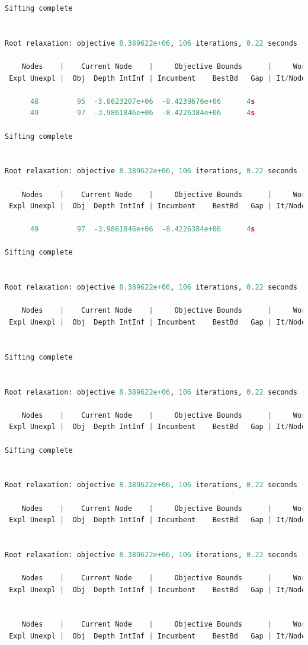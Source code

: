 \documentclass{write_paper}
\begin{document}
\begin{lstlisting}[language=python]
Sifting complete


Root relaxation: objective 8.389622e+06, 106 iterations, 0.22 seconds (0.14 work units)

    Nodes    |    Current Node    |     Objective Bounds      |     Work
 Expl Unexpl |  Obj  Depth IntInf | Incumbent    BestBd   Gap | It/Node Time

      48         95  -3.8623207e+06  -8.4239676e+06      4s
      49         97  -3.9861846e+06  -8.4226384e+06      4s

Sifting complete


Root relaxation: objective 8.389622e+06, 106 iterations, 0.22 seconds (0.14 work units)

    Nodes    |    Current Node    |     Objective Bounds      |     Work
 Expl Unexpl |  Obj  Depth IntInf | Incumbent    BestBd   Gap | It/Node Time

      49         97  -3.9861846e+06  -8.4226384e+06      4s

Sifting complete


Root relaxation: objective 8.389622e+06, 106 iterations, 0.22 seconds (0.14 work units)

    Nodes    |    Current Node    |     Objective Bounds      |     Work
 Expl Unexpl |  Obj  Depth IntInf | Incumbent    BestBd   Gap | It/Node Time


Sifting complete


Root relaxation: objective 8.389622e+06, 106 iterations, 0.22 seconds (0.14 work units)

    Nodes    |    Current Node    |     Objective Bounds      |     Work
 Expl Unexpl |  Obj  Depth IntInf | Incumbent    BestBd   Gap | It/Node Time

Sifting complete


Root relaxation: objective 8.389622e+06, 106 iterations, 0.22 seconds (0.14 work units)

    Nodes    |    Current Node    |     Objective Bounds      |     Work
 Expl Unexpl |  Obj  Depth IntInf | Incumbent    BestBd   Gap | It/Node Time


Root relaxation: objective 8.389622e+06, 106 iterations, 0.22 seconds (0.14 work units)

    Nodes    |    Current Node    |     Objective Bounds      |     Work
 Expl Unexpl |  Obj  Depth IntInf | Incumbent    BestBd   Gap | It/Node Time


    Nodes    |    Current Node    |     Objective Bounds      |     Work
 Expl Unexpl |  Obj  Depth IntInf | Incumbent    BestBd   Gap | It/Node Time



\end{lstlisting}
\end{document}
